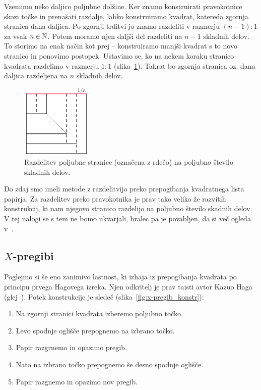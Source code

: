 \begin{dokaz}
    Vzemimo neko daljico poljubne dolžine. Ker znamo konstruirati pravokotnice skozi točke in prenašati razdalje, lahko konstruiramo kvadrat, katereda zgornja stranica dana daljica. Po zgornji trditvi jo znamo razdeliti v razmerju $(n-1) : 1$ za vsak $n \in \mathbb N$. Potem moramo njen daljši del razdeliti na $n-1$ skladnih delov. To storimo na enak način kot prej -- konstruiramo manjši kvadrat s to novo stranico in ponovimo postopek. Ustavimo se, ko na nekem koraku stranico kvadrata razdelimo v razmerju $1:1$ (slika~\ref{fig:razdelitev_daljice_n1}). Takrat bo zgornja stranica oz. dana daljica razdeljena na $n$ skladnih delov.
\begin{figure}[h]
    \centering
    \includegraphics[width=0.3\textwidth]{images/razdelitev_daljice_n1.png}
    \caption[Razdelitev daljice na enake dele]{Razdelitev poljubne stranice (označena z rdečo) na poljubno število skladnih delov.}
    \label{fig:razdelitev_daljice_n1}
\end{figure}
\end{dokaz}

Do zdaj smo imeli metode z razdelitvijo preko prepogibanja kvadratnega lista papirja. Za razdelitev preko pravokotnika je prav tako veliko že razvitih konstrukcij, ki nam njegovo stranico razdelijo na poljubno število skadnih delov. V tej nalogi se s tem ne bomo ukvarjali, bralec pa je povabljen, da si več ogleda v~\cite[str.\ 107--134]{haga2008}.

\subsection{$X$-pregibi}

Poglejmo si še eno zanimivo lastnost, ki izhaja iz prepogibanja kvadrata po principu prvega Hagovega izreka. Njen odkritelj je prav taisti avtor Kazuo Haga (glej~\cite[str.\ 33--44]{haga2008}). Potek konstrukcije je sledeč (slika~\ref{fig:x-pregib_konstr}):
\begin{enumerate}
    \item Na zgornji stranici kvadrata izberemo poljubno točko.
    \item Levo spodnje oglišče prepognemo na izbrano točko.
    \item Papir razgrnemo in opazimo pregib.
    \item Nato na izbrano točko prepognemo še desno spodnje oglišče.
    \item Papir razgnemo in opazimo nov pregib.
\end{enumerate}

